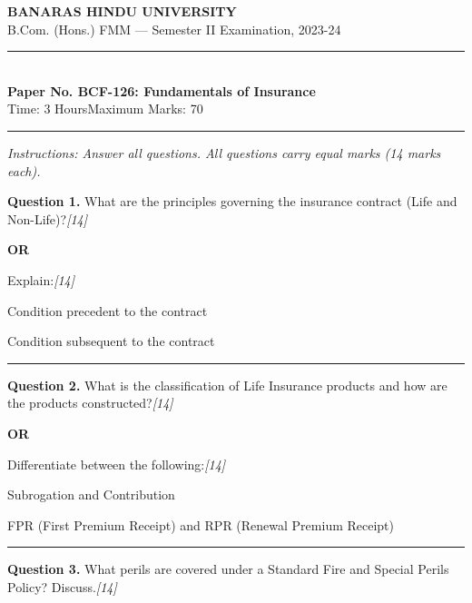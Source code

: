 \documentclass[11pt,a4paper]{article}
\newcommand{\pts}[1]{\hfill   \textit{[#1]}}
\begin{document}
\begin{center}
  {\large\bfseries BANARAS HINDU UNIVERSITY}\\[2pt]
  {\normalsize B.Com. (Hons.) FMM --- Semester II Examination, 2023-24}\\[6pt]
  \rule{0.8\linewidth}{0.5pt}\\[6pt]
  {\large\bfseries Paper No. BCF-126: Fundamentals of Insurance}\\[4pt]
  {\normalsize Time: 3 Hours\hfill Maximum Marks: 70}
\end{center}

\rule{\linewidth}{0.4pt}

\smallskip



\noindent   \textit{Instructions: Answer all questions. All questions carry equal marks (14 marks each).}

\bigskip




\noindent   \textbf{Question 1.}
What are the principles governing the insurance contract (Life and Non-Life)?\pts{14}

\centerline{   \textbf{OR}}

Explain:\pts{14}

\begin{parts}
  \item Condition precedent to the contract
  \item Condition subsequent to the contract
\end{parts}

\medskip\rule{\linewidth}{0.2pt}




\noindent   \textbf{Question 2.}
What is the classification of Life Insurance products and how are the products constructed?\pts{14}

\centerline{   \textbf{OR}}

Differentiate between the following:\pts{14}

\begin{parts}
  \item Subrogation and Contribution
  \item FPR (First Premium Receipt) and RPR (Renewal Premium Receipt)
\end{parts}

\medskip\rule{\linewidth}{0.2pt}




\noindent   \textbf{Question 3.}
What perils are covered under a Standard Fire and Special Perils Policy? Discuss.\pts{14}
\end{document}
